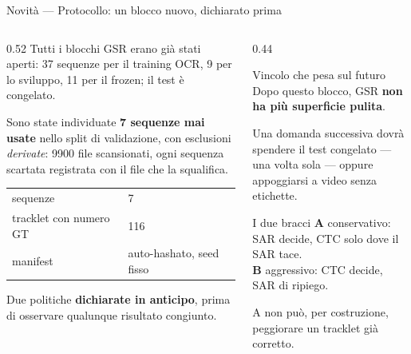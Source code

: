 \documentclass[aspectratio=169,10pt]{beamer}
\begin{document}
\begin{frame}{Novità --- Protocollo: un blocco nuovo, dichiarato prima}
  \begin{columns}[T]
    \begin{column}{0.52\textwidth}
      \small
      Tutti i blocchi GSR erano già stati aperti: 37 sequenze per il training
      OCR, 9 per lo sviluppo, 11 per il frozen; il test è congelato.
      \vspace{0.4em}

      Sono state individuate \textbf{7 sequenze mai usate} nello split di
      validazione, con esclusioni \emph{derivate}: 9900 file scansionati, ogni
      sequenza scartata registrata con il file che la squalifica.
      \vspace{0.4em}
      \begin{center}\footnotesize
      \begin{tabular}{ll}
        \toprule
        sequenze & 7 \\
        tracklet con numero GT & 116 \\
        manifest & auto-hashato, seed fisso \\
        \bottomrule
      \end{tabular}
      \end{center}
      \vspace{0.4em}
      Due politiche \textbf{dichiarate in anticipo}, prima di osservare
      qualunque risultato congiunto.
    \end{column}
    \begin{column}{0.44\textwidth}
      \footnotesize
      \begin{alertblock}{Vincolo che pesa sul futuro}
        Dopo questo blocco, GSR \textbf{non ha più superficie pulita}.
        \vspace{0.3em}

        Una domanda successiva dovrà spendere il test congelato --- una volta
        sola --- oppure appoggiarsi a video senza etichette.
      \end{alertblock}
      \vspace{0.3em}
      \begin{block}{I due bracci}
        \textbf{A} conservativo: SAR decide, CTC solo dove il SAR tace.\\[0.3em]
        \textbf{B} aggressivo: CTC decide, SAR di ripiego.
        \vspace{0.2em}

        A non può, per costruzione, peggiorare un tracklet già corretto.
      \end{block}
    \end{column}
  \end{columns}
\end{frame}
\end{document}
